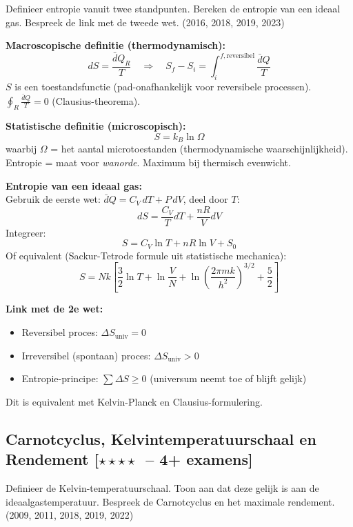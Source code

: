 \documentclass[10pt,a4paper]{article}
\newcommand{\dbar}{\bar{d}}
\begin{document}
\begin{theorievraag}{Definieer entropie vanuit twee standpunten. Bereken de entropie van een ideaal gas. Bespreek de link met de tweede wet. \textnormal{(2016, 2018, 2019, 2023)}}
\end{theorievraag}

\begin{oplossing}
\textbf{Macroscopische definitie (thermodynamisch):}
$$dS = \frac{\dbar Q_R}{T} \quad \Rightarrow \quad S_f - S_i = \int_i^{f,\text{reversibel}} \frac{\dbar Q}{T}$$
$S$ is een toestandsfunctie (pad-onafhankelijk voor reversibele processen).
$\oint_R \frac{\dbar Q}{T} = 0$ (Clausius-theorema).

\textbf{Statistische definitie (microscopisch):}
$$S = k_B \ln\Omega$$
waarbij $\Omega$ = het aantal microtoestanden (thermodynamische waarschijnlijkheid).
Entropie = maat voor \emph{wanorde}. Maximum bij thermisch evenwicht.

\textbf{Entropie van een ideaal gas:}\\
Gebruik de eerste wet: $\dbar Q = C_V\,dT + P\,dV$, deel door $T$:
$$dS = \frac{C_V}{T}dT + \frac{nR}{V}dV$$
Integreer:
$$\boxed{S = C_V \ln T + nR \ln V + S_0}$$
Of equivalent (Sackur-Tetrode formule uit statistische mechanica):
$$S = Nk\left[\frac{3}{2}\ln T + \ln\frac{V}{N} + \ln\!\left(\frac{2\pi mk}{h^2}\right)^{3/2} + \frac{5}{2}\right]$$

\textbf{Link met de 2e wet:}
\begin{itemize}
  \item Reversibel proces: $\Delta S_\text{univ} = 0$
  \item Irreversibel (spontaan) proces: $\Delta S_\text{univ} > 0$
  \item Entropie-principe: $\sum \Delta S \geq 0$ (universum neemt toe of blijft gelijk)
\end{itemize}
Dit is equivalent met Kelvin-Planck en Clausius-formulering.
\end{oplossing}

\subsection{Carnotcyclus, Kelvintemperatuurschaal en Rendement \textnormal{\color{warningred}[$\star\star\star\star$\ -- 4+ examens]}}

\begin{theorievraag}{Definieer de Kelvin-temperatuurschaal. Toon aan dat deze gelijk is aan de ideaalgastemperatuur. Bespreek de Carnotcyclus en het maximale rendement. \textnormal{(2009, 2011, 2018, 2019, 2022)}}
\end{theorievraag}
\end{document}
